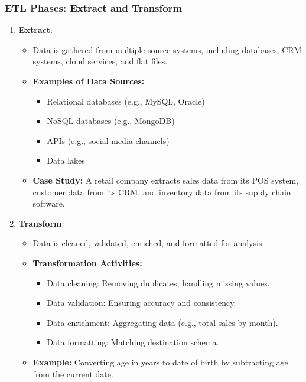 \documentclass{beamer}
\begin{document}
\begin{frame}[fragile]
    \frametitle{ETL Phases: Extract and Transform}
    \begin{enumerate}
        \item \textbf{Extract}:
        \begin{itemize}
            \item Data is gathered from multiple source systems, including databases, CRM systems, cloud services, and flat files.
            \item \textbf{Examples of Data Sources:}
            \begin{itemize}
                \item Relational databases (e.g., MySQL, Oracle)
                \item NoSQL databases (e.g., MongoDB)
                \item APIs (e.g., social media channels)
                \item Data lakes
            \end{itemize}
            \item \textbf{Case Study:} A retail company extracts sales data from its POS system, customer data from its CRM, and inventory data from its supply chain software.
        \end{itemize}

        \item \textbf{Transform}:
        \begin{itemize}
            \item Data is cleaned, validated, enriched, and formatted for analysis.
            \item \textbf{Transformation Activities:}
            \begin{itemize}
                \item Data cleaning: Removing duplicates, handling missing values.
                \item Data validation: Ensuring accuracy and consistency.
                \item Data enrichment: Aggregating data (e.g., total sales by month).
                \item Data formatting: Matching destination schema.
            \end{itemize}
            \item \textbf{Example:} Converting age in years to date of birth by subtracting age from the current date.
        \end{itemize}
    \end{enumerate}
\end{frame}
\end{document}
